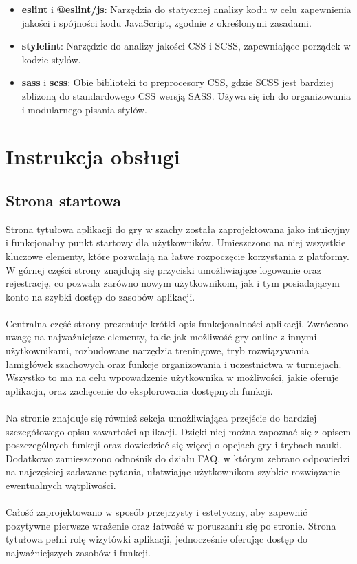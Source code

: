 \documentclass[12pt,a4paper]{article}
\begin{document}
\begin{itemize}
    \item \textbf{eslint} i \textbf{@eslint/js}: Narzędzia do statycznej analizy kodu w celu zapewnienia jakości i spójności kodu JavaScript, zgodnie z określonymi zasadami. 
    \item \textbf{stylelint}: Narzędzie do analizy jakości CSS i SCSS, zapewniające porządek w kodzie stylów. 
    \item \textbf{sass} i \textbf{scss}: Obie biblioteki to preprocesory CSS, gdzie SCSS jest bardziej zbliżoną do standardowego CSS wersją SASS. Używa się ich do organizowania i modularnego pisania stylów. 
\end{itemize}

\newpage
\section{Instrukcja obsługi}
\subsection{Strona startowa}
Strona tytułowa aplikacji do gry w szachy została zaprojektowana jako intuicyjny i funkcjonalny punkt startowy dla użytkowników. Umieszczono na niej wszystkie kluczowe elementy, które pozwalają na łatwe rozpoczęcie korzystania z platformy. W górnej części strony znajdują się przyciski umożliwiające logowanie oraz rejestrację, co pozwala zarówno nowym użytkownikom, jak i tym posiadającym konto na szybki dostęp do zasobów aplikacji.
\\\\
Centralna część strony prezentuje krótki opis funkcjonalności aplikacji. Zwrócono uwagę na najważniejsze elementy, takie jak możliwość gry online z innymi użytkownikami, rozbudowane narzędzia treningowe, tryb rozwiązywania łamigłówek szachowych oraz funkcje organizowania i uczestnictwa w turniejach. Wszystko to ma na celu wprowadzenie użytkownika w możliwości, jakie oferuje aplikacja, oraz zachęcenie do eksplorowania dostępnych funkcji.
\\\\
Na stronie znajduje się również sekcja umożliwiająca przejście do bardziej szczegółowego opisu zawartości aplikacji. Dzięki niej można zapoznać się z opisem poszczególnych funkcji oraz dowiedzieć się więcej o opcjach gry i trybach nauki. Dodatkowo zamieszczono odnośnik do działu FAQ, w którym zebrano odpowiedzi na najczęściej zadawane pytania, ułatwiając użytkownikom szybkie rozwiązanie ewentualnych wątpliwości.
\\\\
Całość zaprojektowano w sposób przejrzysty i estetyczny, aby zapewnić pozytywne pierwsze wrażenie oraz łatwość w poruszaniu się po stronie. Strona tytułowa pełni rolę wizytówki aplikacji, jednocześnie oferując dostęp do najważniejszych zasobów i funkcji.
\end{document}
